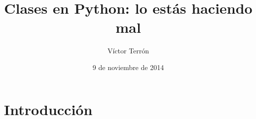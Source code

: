 \documentclass[14pt]{beamer}
\title{Clases en Python: lo estás haciendo mal}
\author{Víctor Terrón}
\date{9 de noviembre de 2014}
\institute{IAA-CSIC}
\begin{document}
\section{Introducción}

\end{document}
